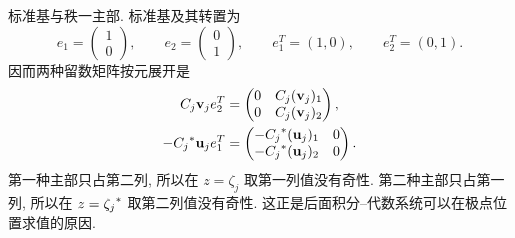 \par\smallskip\noindent 标准基与秩一主部.\quad
标准基及其转置为
\begin{equation*}
e_1=\begin{pmatrix}1\\0\end{pmatrix},\qquad
e_2=\begin{pmatrix}0\\1\end{pmatrix},\qquad
e_1^T=(1,0),\qquad e_2^T=(0,1).
\end{equation*}
因而两种留数矩阵按元展开是
\begin{equation*}
\begin{aligned}
C_j\mathbf v_je_2^T
&=\begin{pmatrix}
0&C_j(\mathbf v_j)_1\\
0&C_j(\mathbf v_j)_2
\end{pmatrix},\\
-{C_j}^{*}\mathbf u_je_1^T
&=\begin{pmatrix}
-{C_j}^{*}(\mathbf u_j)_1&0\\
-{C_j}^{*}(\mathbf u_j)_2&0
\end{pmatrix}.
\end{aligned}
\end{equation*}
第一种主部只占第二列, 所以在 $z=\zeta_j$ 取第一列值没有奇性.
第二种主部只占第一列, 所以在 $z={\zeta_j}^{*}$ 取第二列值没有奇性.
这正是后面积分--代数系统可以在极点位置求值的原因.

